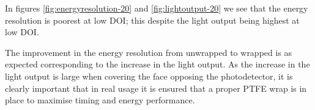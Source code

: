 In figures \ref{fig:energyresolution-20} and \ref{fig:lightoutput-20} we see that the energy resolution is poorest at low DOI; this despite the light output being highest at low DOI. 

The improvement in the energy resolution from unwrapped to wrapped is as expected corresponding to the increase in the light output. As the increase in the light output is large when covering the face opposing the photodetector, it is clearly important that in real usage it is ensured that a proper PTFE wrap is in place to maximise timing and energy performance.